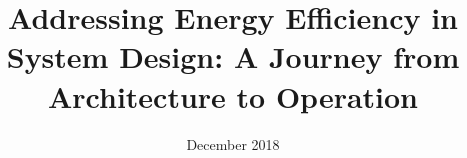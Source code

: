 \documentclass[a4paper, oneside, 11pt, hidelinks]{Thesis}  %
\begin{document}
\frontmatter      %

\title  {Addressing Energy Efficiency in System Design: A Journey from Architecture to Operation}
\addresses  {\groupname\\\deptname\\\univname}  %
\date       {December 2018}
\subject    {}
\keywords   {}

\maketitle

\pagestyle{plain}  %
\end{document}
